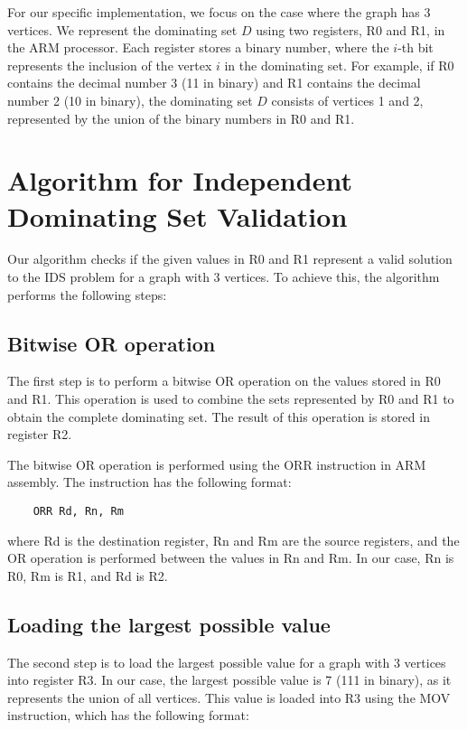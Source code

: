 For our specific implementation, we focus on the case where the graph has 3 vertices. We represent the dominating set $D$ using two registers, R0 and R1, in the ARM processor. Each register stores a binary number, where the $i$-th bit represents the inclusion of the vertex $i$ in the dominating set. For example, if R0 contains the decimal number 3 (11 in binary) and R1 contains the decimal number 2 (10 in binary), the dominating set $D$ consists of vertices 1 and 2, represented by the union of the binary numbers in R0 and R1.

\section{Algorithm for Independent Dominating Set Validation}

Our algorithm checks if the given values in R0 and R1 represent a valid solution to the IDS problem for a graph with 3 vertices. To achieve this, the algorithm performs the following steps:

\subsection{Bitwise OR operation}

The first step is to perform a bitwise OR operation on the values stored in R0 and R1. This operation is used to combine the sets represented by R0 and R1 to obtain the complete dominating set. The result of this operation is stored in register R2.

The bitwise OR operation is performed using the ORR instruction in ARM assembly. The instruction has the following format:

\begin{verbatim}
    ORR Rd, Rn, Rm
\end{verbatim}

where Rd is the destination register, Rn and Rm are the source registers, and the OR operation is performed between the values in Rn and Rm. In our case, Rn is R0, Rm is R1, and Rd is R2.

\subsection{Loading the largest possible value}

The second step is to load the largest possible value for a graph with 3 vertices into register R3. In our case, the largest possible value is 7 (111 in binary), as it represents the union of all vertices. This value is loaded into R3 using the MOV instruction, which has the following format:

